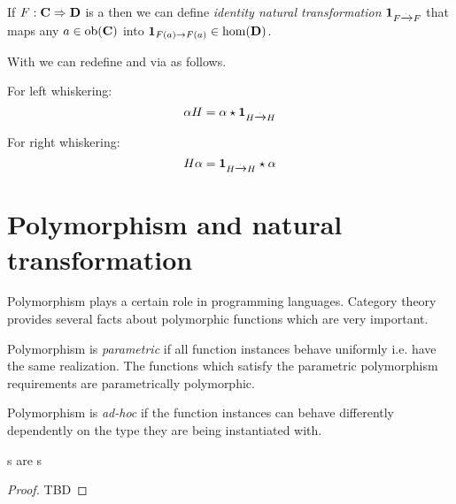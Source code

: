 \begin{definition}
\label{def:idnt}
If $F: \mathbf{C} \Rightarrow \mathbf{D}$ is a  then we can
define \textit{identity natural transformation}
$\mathbf{1}_{ F \xrightarrow{.} F }$ that maps any  
$a \in \mathrm{ob}(\mathbf{C})$ into  $\mathbf{1}_{ F(a) \to F(a) } \in \mathrm{hom}(\mathbf{D})$.
\end{definition}

\begin{remark}[Whiskering]
\label{rem:whiskering}
With  we can redefine  and
 via  as follows.

For left whiskering:
\begin{equation}
\label{eq:lw}
\alpha H = \alpha \star \mathbf{1}_{ H \xrightarrow{.} H }
\end{equation}

For right whiskering:
\begin{equation}
\label{eq:rw}
H \alpha = \mathbf{1}_{ H \xrightarrow{.} H } \star \alpha
\end{equation}
\end{remark}


\section{Polymorphism and natural transformation}

Polymorphism plays a certain role in programming languages. Category
theory provides several facts about polymorphic functions which are
very important.

\begin{definition}
\label{def:pp_function}
Polymorphism is \textit{parametric} if all function instances behave uniformly
i.e. have the same realization. The functions which satisfy the
parametric polymorphism requirements are parametrically polymorphic.
\end{definition}

\begin{definition}
\label{def:ad_hoc_polymorphism}
Polymorphism is \textit{ad-hoc} if the function instances can behave
differently dependently on the type they are being instantiated with. 
\end{definition}

\begin{theorem}[Reynolds]
\label{thm:reynolds}
s are s 
\begin{proof}
TBD
\end{proof}
\end{theorem}

